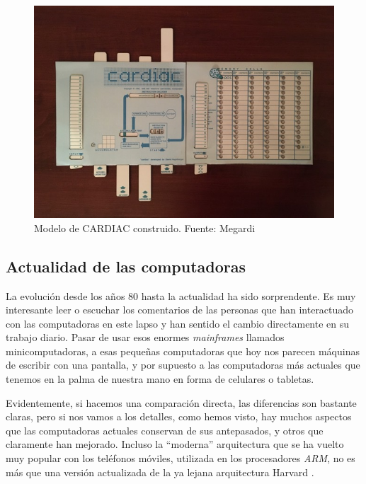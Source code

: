 \documentclass[letterpaper,12pt,oneside]{book}
\begin{document}
		\begin{figure}[h]
		\centering
			\includegraphics[scale=0.75]{media/CARDIAC_Paper/Construida.jpg}
			\caption{Modelo de CARDIAC construido. Fuente: Megardi \cite{megardi_cardiac_nodate}}
			\label{fig:CARDIAC_Construida}
		\end{figure}

		\clearpage		

	
		\subsection{Actualidad de las computadoras}
		
		La evolución desde los años 80 hasta la actualidad ha sido sorprendente. Es muy interesante leer o escuchar los comentarios de las personas que han interactuado
		con las computadoras en este lapso y han sentido el cambio directamente en su trabajo diario. Pasar de usar esos enormes \textit{mainframes}
		llamados minicomputadoras, a esas pequeñas computadoras que hoy nos parecen  máquinas de escribir con una pantalla, y por supuesto a las 
		computadoras más actuales que tenemos en la palma de nuestra mano en forma de celulares o tabletas.
  
  
        Evidentemente, si hacemos una comparación directa, las diferencias
		son bastante claras, pero si nos vamos a los detalles, como hemos visto, hay muchos aspectos que las computadoras actuales conservan de sus antepasados, y otros que claramente
		han mejorado. Incluso la ``moderna''  arquitectura  que se ha vuelto muy popular con los teléfonos móviles, utilizada en los procesadores \textit{ARM}, no es más que una versión actualizada de la ya lejana arquitectura Harvard  \cite[p. 109]{valvano_introduction_2017}.
  
\end{document}
